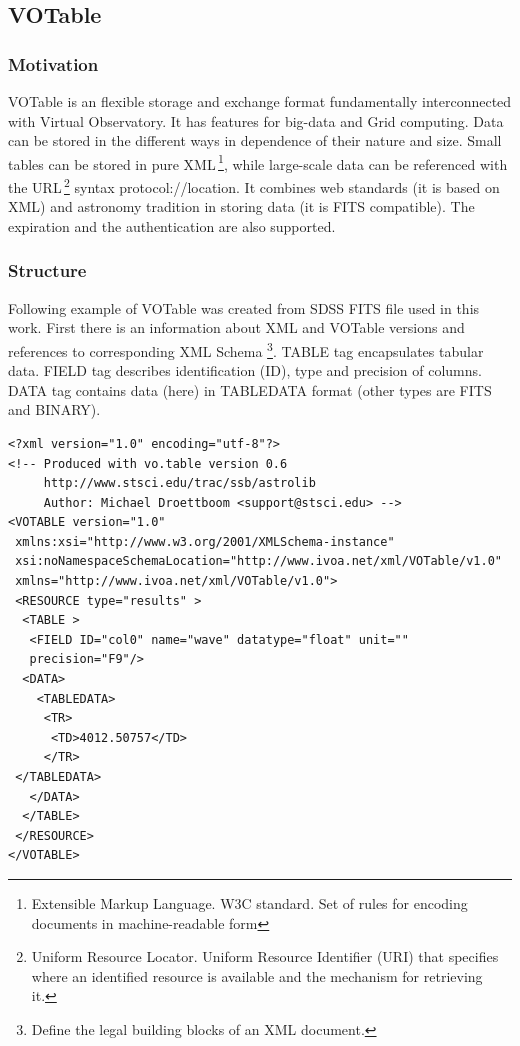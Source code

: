 \subsection{VOTable}
\label{sec:votable}
\subsubsection*{Motivation}
VOTable is an flexible storage and exchange format fundamentally
interconnected with Virtual Observatory. It has features for big-data
and Grid computing. Data can be stored in the different ways in
dependence of their nature and size. Small tables can be stored in
pure XML\,\footnote{Extensible Markup Language. W3C standard. Set of
  rules for encoding documents in machine-readable form}, while
large-scale data can be referenced with the URL\,\footnote{Uniform
  Resource Locator. Uniform Resource Identifier (URI) that specifies
  where an identified resource is available and the mechanism for
  retrieving it.} syntax protocol://location.  It combines web
standards (it is based on XML) and astronomy tradition in storing data
(it is FITS compatible). The expiration and the authentication are
also supported.

\subsubsection*{Structure}
Following example of VOTable was created from SDSS FITS file used in
this work. First there is an information about XML and VOTable
versions and references to corresponding XML Schema \footnote{Define
  the legal building blocks of an XML document.}. \textrm{TABLE} tag
encapsulates tabular data. \textrm{FIELD} tag describes identification
(ID), type and precision of columns. \textrm{DATA} tag contains data
(here) in TABLEDATA format (other types are FITS and BINARY).
 
\begin{lstlisting}
<?xml version="1.0" encoding="utf-8"?>
<!-- Produced with vo.table version 0.6
     http://www.stsci.edu/trac/ssb/astrolib
     Author: Michael Droettboom <support@stsci.edu> -->
<VOTABLE version="1.0"
 xmlns:xsi="http://www.w3.org/2001/XMLSchema-instance"
 xsi:noNamespaceSchemaLocation="http://www.ivoa.net/xml/VOTable/v1.0"
 xmlns="http://www.ivoa.net/xml/VOTable/v1.0">
 <RESOURCE type="results" >
  <TABLE >
   <FIELD ID="col0" name="wave" datatype="float" unit=""
   precision="F9"/>
  <DATA>
    <TABLEDATA>
     <TR>
      <TD>4012.50757</TD>
     </TR>
 </TABLEDATA>
   </DATA>
  </TABLE>
 </RESOURCE>
</VOTABLE>
\end{lstlisting}


